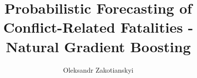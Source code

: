 \documentclass[runningheads]{llncs}
\begin{document}
%
    \title{Probabilistic Forecasting of Conflict-Related Fatalities - Natural Gradient Boosting}


%
%
    \author{Oleksandr Zakotianskyi}
%
%
%
    \maketitle              %
%
\end{document}
